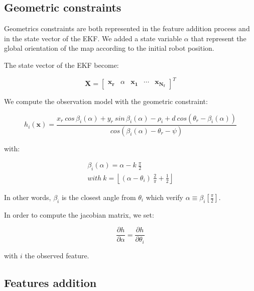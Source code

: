 \documentclass[a4paper,12pt]{article}
\begin{document}
\subsection{Geometric constraints}
\label{sec:geom}

Geometrics constraints are both represented in the feature addition process and in the state vector of the EKF.
We added a state variable $\alpha$ that represent the global orientation of the map according to the initial robot position.


The state vector of the EKF become:

\begin{equation}
\mathbf{X} = 
\left [
\begin{array}{ccccc}
\mathbf{x_r}&
\alpha& 
\mathbf{x_1}&
\cdots &  
\mathbf{x_{N_f}}
\end{array}
\right ]^T
\end{equation}

We compute the observation model with the geometric constraint:

\begin{equation}
h_i(\mathbf{x}) =\frac{ x_r \: cos \, \beta_i(\alpha) + y_r \: sin \, \beta_i(\alpha) - \rho_i + d\: cos(\theta_r-\beta_i(\alpha))}{cos(\beta_i(\alpha)-\theta_r-\psi)} 
\end{equation}

with:

\begin{equation}
\begin{array}{l}
\beta_i(\alpha) = \alpha - k \: \frac{\pi}{2}\\
\mathit{with } \: k = \left \lfloor (\alpha-\theta_i) \: \frac{2 }{\pi} +\frac{1}{2} \right \rfloor
\end{array}
\end{equation}

In other words, $\beta_i$ is the closest angle from $\theta_i$ which verify $\alpha \equiv \beta_i \left [ \frac{\pi}{2} \right ]$.

In order to compute the jacobian matrix, we set:

\begin{equation}
\frac{\partial h}{\partial \alpha} = \frac{\partial h}{\partial \theta_i}
\end{equation}

with $i$ the observed feature.

\subsection{Features addition}
\label{sec:features}
\end{document}
